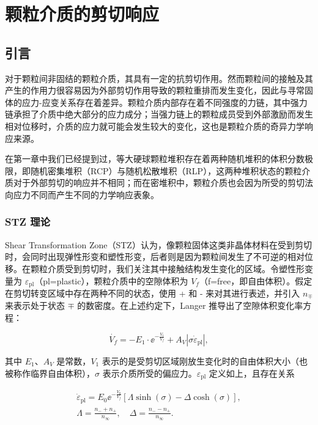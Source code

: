 
\chapter{颗粒介质的剪切响应}

\section{引言}

对于颗粒间非固结的颗粒介质，其具有一定的抗剪切作用。然而颗粒间的接触及其产生的作用力很容易因为外部剪切作用导致的颗粒重排而发生变化，因此与寻常固体的应力-应变关系存在着差异。颗粒介质内部存在着不同强度的力链，其中强力链承担了介质中绝大部分的应力成分；当强力链上的颗粒成员受到外部激励而发生相对位移时，介质的应力就可能会发生较大的变化，这也是颗粒介质的奇异力学响应来源。

在第一章中我们已经提到过，等大硬球颗粒堆积存在着两种随机堆积的体积分数极限，即随机密集堆积（RCP）与随机松散堆积（RLP），这两种堆积状态的颗粒介质对于外部剪切的响应并不相同；而在密堆积中，颗粒介质也会因为所受的剪切法向应力不同而产生不同的力学响应表象。


\subsection{STZ 理论}

Shear Transformation Zone（STZ）认为，像颗粒固体这类非晶体材料在受到剪切时，会同时出现弹性形变和塑性形变，后者则是因为颗粒间发生了不可逆的相对位移。在颗粒介质受到剪切时，我们关注其中接触结构发生变化的区域。令塑性形变量为 $\varepsilon_{\text{pl}}$（pl=plastic），颗粒介质中的空隙体积为 $V_{f}$（f=free，即自由体积）。假定在剪切转变区域中存在两种不同的状态，使用 + 和 - 来对其进行表述，并引入 $n_{\mp}$ 来表示处于状态 $\mp$ 的数密度。在上述约定下，Langer 推导出了空隙体积变化率方程\cite{PhysRevE.64.011504}：

\begin{equation}
  \dot{V_{f}} = -E_{1}\cdot{\ee}^{-\frac{V_{1}}{V_{f}}} + A_{V}|\sigma\dot{\varepsilon}_{\text{pl}}|,
\end{equation}

其中 $E_{1}$、$A_{V}$ 是常数，$V_{1}$ 表示的是受剪切区域刚放生变化时的自由体积大小（也被称作临界自由体积），$\sigma$ 表示介质所受的偏应力。$\varepsilon_{\text{pl}}$ 定义如上，且存在关系

\begin{align}
  \dot{\varepsilon}_{\text{pl}} = E_{0}{\ee}^{-\frac{V_{0}}{V_{f}}}\left[\Lambda\sinh{(\sigma)} - \Delta\cosh{(\sigma)}\right],\\
  \Lambda = \frac{n_{-} + n_{+}}{n_{\infty}},\quad\Delta = \frac{n_{-} - n_{+}}{n_{\infty}}.
\end{align}

